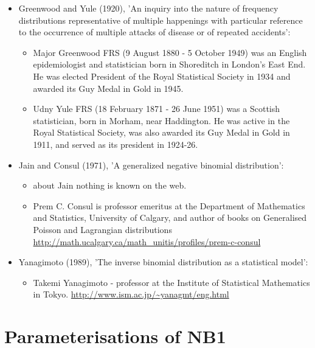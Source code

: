 \begin{itemize}
\item 
Greenwood and Yule (1920), 'An inquiry into the nature of frequency 
distributions representative of multiple happenings with particular 
reference to the occurrence of multiple attacks of disease or of 
repeated accidents':
\begin{itemize}
\item 
Major Greenwood FRS (9 August 1880 - 5 October 1949) was 
an English epidemiologist and statistician born in Shoreditch in 
London's East End. He was elected President of the Royal Statistical 
Society in 1934 and awarded its Guy Medal in Gold in 1945.
\item 
Udny Yule FRS (18 February 1871 - 26 June 1951) was a 
Scottish statistician, born in Morham, near Haddington. He was active 
in the Royal Statistical Society, was also awarded its Guy Medal in Gold 
in 1911, and served as its president in 1924-26.
\end{itemize}
\item 
Jain and Consul (1971), 'A generalized negative binomial distribution':
\begin{itemize}
\item 
about Jain nothing is known on the web.
\item 
Prem C. Consul is professor emeritus at the Department 
of Mathematics and Statistics, University of Calgary, and author of 
books on Generalised Poisson and Lagrangian distributions 
\url{http://math.ucalgary.ca/math_unitis/profiles/prem-c-consul}
\end{itemize}
\item 
Yanagimoto (1989), 'The inverse binomial distribution as a statistical 
model':
\begin{itemize}
\item 
Takemi Yanagimoto - professor at the Institute of 
Statistical Mathematics in Tokyo.
\url{http://www.ism.ac.jp/~yanagmt/eng.html}
\end{itemize}
\end{itemize}

\newpage
\section{Parameterisations of NB1}
\label{app:sec:NB1discussion}

